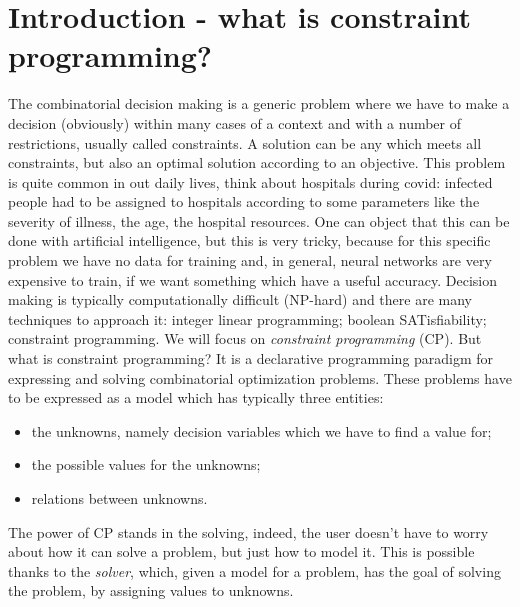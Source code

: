 \documentclass[10pt,a4paper]{article}
\begin{document}
\begin{titlepage}
\end{titlepage}

\tableofcontents
\newpage

\section{Introduction - what is constraint programming?}
The combinatorial decision making is a generic problem where we have to make a
decision (obviously) within many cases of a context and with a number of
restrictions, usually called constraints. A solution can be any which meets all
constraints, but also an optimal solution according to an objective. This
problem is quite common in out daily lives, think about hospitals during covid:
infected people had to be assigned to hospitals according to some parameters
like the severity of illness, the age, the hospital resources. One can object
that this can be done with artificial intelligence, but this is very tricky,
because for this specific problem we have no data for training and, in general,
neural networks are very expensive to train, if we want something which have a
useful accuracy. Decision making is typically computationally difficult
(NP-hard) and there are many techniques to approach it: integer linear
programming; boolean SATisfiability; constraint programming. We will focus on
\textit{constraint programming} (CP). But what is constraint programming? It is
a declarative programming paradigm for expressing and solving combinatorial
optimization problems. These problems have to be expressed as a model which has
typically three entities:
\begin{itemize}
    \item the unknowns, namely decision variables which we have to find a value
    for;
    \item the possible values for the unknowns;
    \item relations between unknowns.
\end{itemize}
The power of CP stands in the solving, indeed, the user doesn't have to worry
about how it can solve a problem, but just how to model it. This is possible
thanks to the \textit{solver}, which, given a model for a problem, has the goal
of solving the problem, by assigning values to unknowns.
\end{document}
